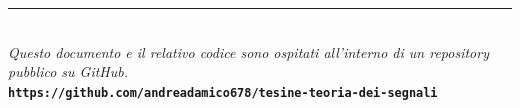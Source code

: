 \vfill
\begin{center}
    \rule{0.6\textwidth}{0.4pt} \\
    \vspace{0.2cm}
    \small{\textit{Questo documento e il relativo codice sono ospitati all'interno di un repository pubblico su GitHub.}} \\
    \vspace{0.1cm}
    \textbf{\texttt{https://github.com/andreadamico678/tesine-teoria-dei-segnali}}
\end{center}
